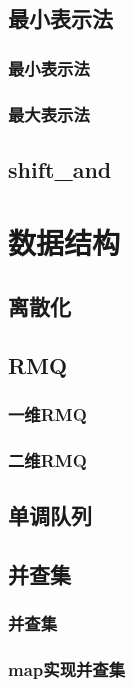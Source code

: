 ﻿\documentclass[a4paper,twocolumn]{article}
\begin{document}
\subsection{最小表示法}
\subsubsection{最小表示法}

\subsubsection{最大表示法}

\subsection{shift\_and}

\section{数据结构}
\subsection{离散化}

\subsection{RMQ}
\subsubsection{一维RMQ}

\subsubsection{二维RMQ}

\subsection{单调队列}

\subsection{并查集}
\subsubsection{并查集}

\subsubsection{map实现并查集}

\end{document}
